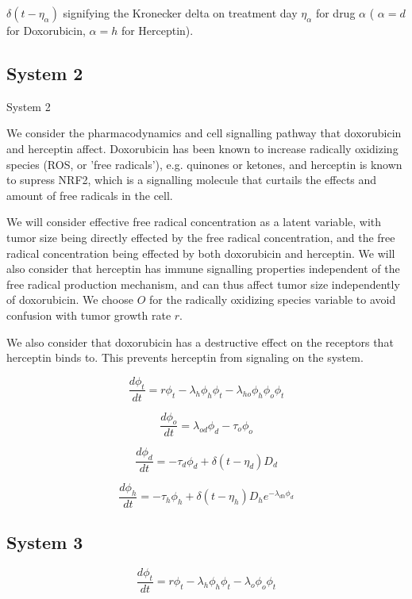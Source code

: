 \documentclass{article}
\begin{document}
$ \delta(t-\eta_{\alpha}) $ signifying the Kronecker delta on treatment day $ \eta_{\alpha} $ for drug $ \alpha $ ( $ \alpha = d $ for Doxorubicin, $ \alpha = h $ for Herceptin).




\subsection{System 2}




System 2

We consider the pharmacodynamics and cell signalling pathway that doxorubicin and herceptin affect. Doxorubicin has been known to increase radically oxidizing species (ROS, or 'free radicals'), e.g. quinones or ketones, and herceptin is known to supress NRF2, which is a signalling molecule that curtails the effects and amount of free radicals in the cell.  


We will consider effective free radical concentration as a latent variable, with tumor size being directly effected by the free radical concentration, and the free radical concentration being effected by both doxorubicin and herceptin. We will also consider that herceptin has immune signalling properties independent of the free radical production mechanism, and can thus affect tumor size independently of doxorubicin. We choose $O$ for the radically oxidizing species variable to avoid confusion with tumor growth rate $r$.


We also consider that doxorubicin has a destructive effect on the receptors that herceptin binds to. This prevents herceptin from signaling on the system.



$$ \frac{d \phi_t}{dt} = r \phi_t - \lambda_h \phi_h \phi_t - \lambda_{ho} \phi_h \phi_o \phi_t $$

$$ \frac{d \phi_o}{dt} = \lambda_{od} \phi_d - \tau_o \phi_o $$

$$ \frac{d \phi_d}{dt} = - \tau_d \phi_d + \delta (t - \eta_d) D_d $$

$$ \frac{d \phi_h}{dt} = - \tau_h \phi_h + \delta (t - \eta_h) D_h e^{-\lambda_{dh} \phi_d} $$



\subsection{System 3}

$$ \frac{d \phi_t}{dt} = r \phi_t - \lambda_h \phi_h \phi_t - \lambda_o \phi_o \phi_t $$
\end{document}
